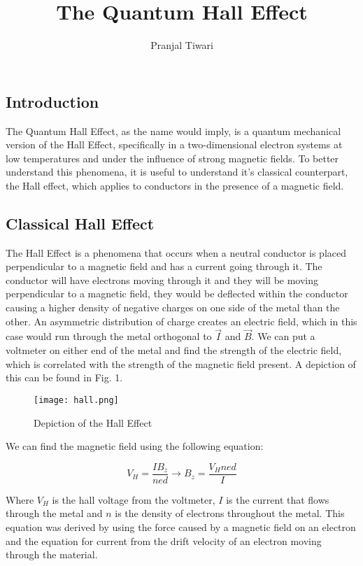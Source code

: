 \documentclass[14pt]{article}
\title{The Quantum Hall Effect}
\author{Pranjal Tiwari}
\begin{document}
\maketitle

\subsection*{Introduction}

The Quantum Hall Effect, as the name would imply, is a quantum mechanical version of the Hall Effect, specifically in a two-dimensional electron systems at low temperatures and under the influence of strong magnetic fields. To better understand this phenomena, it is useful to understand it's classical counterpart, the Hall effect, which applies to conductors in the presence of a magnetic field.

\subsection*{Classical Hall Effect}

The Hall Effect is a phenomena that occurs when a neutral conductor is placed perpendicular to a magnetic field and has a current going through it. The conductor will have electrons moving through it and they will be moving perpendicular to a magnetic field, they would be deflected within the conductor causing a higher density of negative charges on one side of the metal than the other. An asymmetric distribution of charge creates an electric field, which in this case would run through the metal orthogonal to $\vec{I}$ and $\vec{B}$. We can put a voltmeter on either end of the metal and find the strength of the electric field, which is correlated with the strength of the magnetic field present. A depiction of this can be found in Fig. 1.\\

\begin{figure}[ht]
	\centering
	\texttt{[image: hall.png]}
	\label{fig:sheet1}
	\caption{Depiction of the Hall Effect\cite{hepic}}
\end{figure}

We can find the magnetic field using the following equation:

\begin{equation*}
V_H=\frac{IB_z}{ned} \rightarrow B_z=\frac{V_Hned}{I}
\end{equation*}

Where $V_H$ is the hall voltage from the voltmeter, $I$ is the current that flows through the metal and $n$ is the density of electrons throughout the metal. This equation was derived by using the force caused by a magnetic field on an electron and the equation for current from the drift velocity of an electron moving through the material.\\
\end{document}
